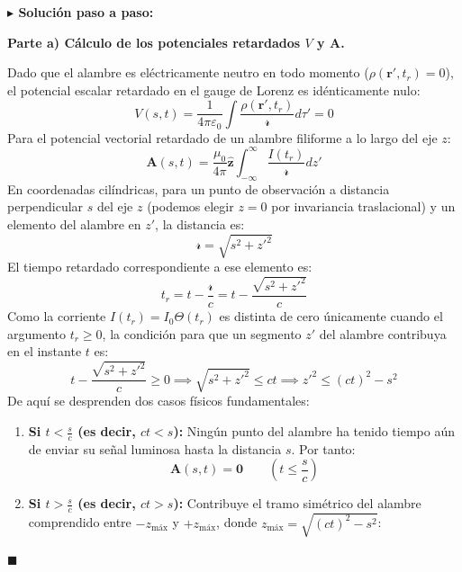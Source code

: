 \documentclass[11pt,a4paper]{book}
\newenvironment{solucion}{%
    \par\medskip\noindent\textbf{\color{blue!65!black}\Large $\blacktriangleright$ Solución paso a paso:}\par\medskip
}{%
    \hfill$\blacksquare$\par\bigskip
}
\newcommand{\zhat}{\hat{\bm{z}}}
\newcommand{\Avec}{\bm{A}}
\begin{document}
\begin{solucion}
\textbf{Parte a) Cálculo de los potenciales retardados $V$ y $\Avec$.}

Dado que el alambre es eléctricamente neutro en todo momento ($\rho(\bm{r}',t_r) = 0$), el potencial escalar retardado en el gauge de Lorenz es idénticamente nulo:
\begin{equation}
    V(s,t) = \frac{1}{4\pi\varepsilon_0} \int \frac{\rho(\bm{r}', t_r)}{\mathscr{r}} d\tau' = 0
\end{equation}
Para el potencial vectorial retardado de un alambre filiforme a lo largo del eje $z$:
\begin{equation}
    \Avec(s,t) = \frac{\mu_0}{4\pi}\zhat \int_{-\infty}^{\infty} \frac{I(t_r)}{\mathscr{r}} dz'
\end{equation}
En coordenadas cilíndricas, para un punto de observación a distancia perpendicular $s$ del eje $z$ (podemos elegir $z = 0$ por invariancia traslacional) y un elemento del alambre en $z'$, la distancia es:
\begin{equation}
    \mathscr{r} = \sqrt{s^2 + z'^2}
\end{equation}
El tiempo retardado correspondiente a ese elemento es:
\begin{equation}
    t_r = t - \frac{\mathscr{r}}{c} = t - \frac{\sqrt{s^2 + z'^2}}{c}
\end{equation}
Como la corriente $I(t_r) = I_0 \Theta(t_r)$ es distinta de cero únicamente cuando el argumento $t_r \ge 0$, la condición para que un segmento $z'$ del alambre contribuya en el instante $t$ es:
\begin{equation}
    t - \frac{\sqrt{s^2 + z'^2}}{c} \ge 0 \implies \sqrt{s^2 + z'^2} \le ct \implies z'^2 \le (ct)^2 - s^2
\end{equation}
De aquí se desprenden dos casos físicos fundamentales:
\begin{enumerate}
    \item \textbf{Si $t < \frac{s}{c}$ (es decir, $ct < s$):} Ningún punto del alambre ha tenido tiempo aún de enviar su señal luminosa hasta la distancia $s$. Por tanto:
    \begin{equation}
        \Avec(s,t) = \bm{0} \qquad \left(t \le \frac{s}{c}\right)
    \end{equation}
    \item \textbf{Si $t > \frac{s}{c}$ (es decir, $ct > s$):} Contribuye el tramo simétrico del alambre comprendido entre $-z_{\text{máx}}$ y $+z_{\text{máx}}$, donde $z_{\text{máx}} = \sqrt{(ct)^2 - s^2}$:
    \begin{equation}

\end{equation}
\end{enumerate}
\end{solucion}
\end{document}
